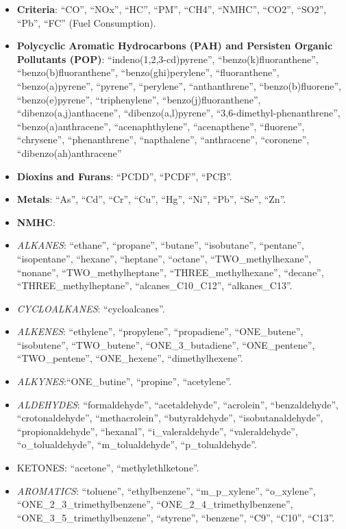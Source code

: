 \documentclass[12pt,graybox,envcountchap,sectrefs]{krantz}
\providecommand{\tightlist}{%
  \setlength{\itemsep}{0pt}\setlength{\parskip}{0pt}}
\theoremstyle{definition}
\theoremstyle{definition}
\theoremstyle{definition}
\theoremstyle{remark}
\begin{document}
\begin{itemize}
\tightlist
\item
  \textbf{Criteria}: ``CO'', ``NOx'', ``HC'', ``PM'', ``CH4'', ``NMHC'',
  ``CO2'', ``SO2'', ``Pb'', ``FC'' (Fuel Consumption).
\item
  \textbf{Polycyclic Aromatic Hydrocarbons (PAH) and Persisten Organic
  Pollutants (POP)}: ``indeno(1,2,3-cd)pyrene'',
  ``benzo(k)fluoranthene'', ``benzo(b)fluoranthene'',
  ``benzo(ghi)perylene'', ``fluoranthene'', ``benzo(a)pyrene'',
  ``pyrene'', ``perylene'', ``anthanthrene'', ``benzo(b)fluorene'',
  ``benzo(e)pyrene'', ``triphenylene'', ``benzo(j)fluoranthene'',
  ``dibenzo(a,j)anthacene'', ``dibenzo(a,l)pyrene'',
  ``3,6-dimethyl-phenanthrene'', ``benzo(a)anthracene'',
  ``acenaphthylene'', ``acenapthene'', ``fluorene'', ``chrysene'',
  ``phenanthrene'', ``napthalene'', ``anthracene'', ``coronene'',
  ``dibenzo(ah)anthracene''
\item
  \textbf{Dioxins and Furans}: ``PCDD'', ``PCDF'', ``PCB''.
\item
  \textbf{Metals}: ``As'', ``Cd'', ``Cr'', ``Cu'', ``Hg'', ``Ni'',
  ``Pb'', ``Se'', ``Zn''.
\item
  \textbf{NMHC}:
\item
  \emph{ALKANES}: ``ethane'', ``propane'', ``butane'', ``isobutane'',
  ``pentane'', ``isopentane'', ``hexane'', ``heptane'', ``octane'',
  ``TWO\_methylhexane'', ``nonane'', ``TWO\_methylheptane'',
  ``THREE\_methylhexane'', ``decane'', ``THREE\_methylheptane'',
  ``alcanes\_C10\_C12'', ``alkanes\_C13''.
\item
  \emph{CYCLOALKANES}: ``cycloalcanes''.
\item
  \emph{ALKENES}: ``ethylene'', ``propylene'', ``propadiene'',
  ``ONE\_butene'', ``isobutene'', ``TWO\_butene'',
  ``ONE\_3\_butadiene'', ``ONE\_pentene'', ``TWO\_pentene'',
  ``ONE\_hexene'', ``dimethylhexene''.
\item
  \emph{ALKYNES}:``ONE\_butine'', ``propine'', ``acetylene''.
\item
  \emph{ALDEHYDES}: ``formaldehyde'', ``acetaldehyde'', ``acrolein'',
  ``benzaldehyde'', ``crotonaldehyde'', ``methacrolein'',
  ``butyraldehyde'', ``isobutanaldehyde'', ``propionaldehyde'',
  ``hexanal'', ``i\_valeraldehyde'', ``valeraldehyde'',
  ``o\_tolualdehyde'', ``m\_tolualdehyde'', ``p\_tolualdehyde''.
\item
  KETONES: ``acetone'', ``methylethlketone''.
\item
  \emph{AROMATICS}: ``toluene'', ``ethylbenzene'', ``m\_p\_xylene'',
  ``o\_xylene'', ``ONE\_2\_3\_trimethylbenzene'',
  ``ONE\_2\_4\_trimethylbenzene'', ``ONE\_3\_5\_trimethylbenzene'',
  ``styrene'', ``benzene'', ``C9'', ``C10'', ``C13''.
\end{itemize}
\end{document}
